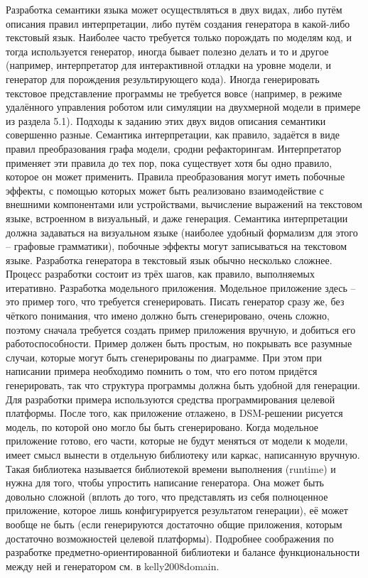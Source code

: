 Разработка семантики языка может осуществляться в двух видах, либо путём описания правил интерпретации, либо путём создания генератора в какой-либо текстовый язык. Наиболее часто требуется только порождать по моделям код, и тогда используется генератор, иногда бывает полезно делать и то и другое (например, интерпретатор для интерактивной отладки на уровне модели, и генератор для порождения результирующего кода). Иногда генерировать текстовое представление программы не требуется вовсе (например, в режиме удалённого управления роботом или симуляции на двухмерной модели в примере из раздела 5.1). Подходы к заданию этих двух видов описания семантики совершенно разные.
Семантика интерпретации, как правило, задаётся в виде правил преобразования графа модели, сродни рефакторингам. Интерпретатор применяет эти правила до тех пор, пока существует хотя бы одно правило, которое он может применить. Правила преобразования могут иметь побочные эффекты, с помощью которых может быть реализовано взаимодействие с внешними компонентами или устройствами, вычисление выражений на текстовом языке, встроенном в визуальный, и даже генерация. Семантика интерпретации должна задаваться на визуальном языке (наиболее удобный формализм для этого – графовые грамматики), побочные эффекты могут записываться на текстовом языке.
Разработка генератора в текстовый язык обычно несколько сложнее. Процесс разработки состоит из трёх шагов, как правило, выполняемых итеративно.
Разработка модельного приложения. Модельное приложение здесь – это пример того, что требуется сгенерировать. Писать генератор сразу же, без чёткого понимания, что имено должно быть сгенерировано, очень сложно, поэтому сначала требуется создать пример приложения вручную, и добиться его работоспособности. Пример должен быть простым, но покрывать все разумные случаи, которые могут быть сгенерированы по диаграмме. При этом при написании примера необходимо помнить о том, что его потом придётся генерировать, так что структура программы должна быть удобной для генерации. Для разработки примера используются средства программирования целевой платформы. После того, как приложение отлажено, в DSM-решении рисуется модель, по которой оно могло бы быть сгенерировано.
Когда модельное приложение готово, его части, которые не будут меняться от модели к модели, имеет смысл вынести в отдельную библиотеку или каркас, написанную вручную. Такая библиотека называется библиотекой времени выполнения (runtime) и нужна для того, чтобы упростить написание генератора. Она может быть довольно сложной (вплоть до того, что представлять из себя полноценное приложение, которое лишь конфигурируется результатом генерации), её может вообще не быть (если генерируются достаточно общие приложения, которым достаточно возможностей целевой платформы). Подробнее соображения по разработке предметно-ориентированной библиотеки и балансе функциональности между ней и генератором см. в kelly2008domain.
